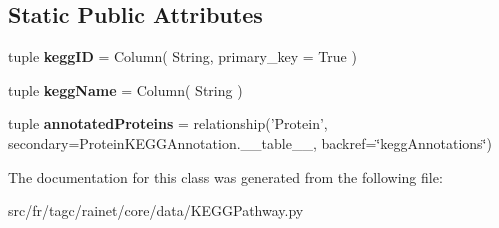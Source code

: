 \subsection*{Static Public Attributes}
\begin{DoxyCompactItemize}
\item 
\hypertarget{classsrc_1_1fr_1_1tagc_1_1rainet_1_1core_1_1data_1_1KEGGPathway_1_1KEGGPathway_a87bfa8948cee850036a02dc04a97f3e3}{tuple {\bfseries kegg\-I\-D} = Column( String, primary\-\_\-key = True )}\label{classsrc_1_1fr_1_1tagc_1_1rainet_1_1core_1_1data_1_1KEGGPathway_1_1KEGGPathway_a87bfa8948cee850036a02dc04a97f3e3}

\item 
\hypertarget{classsrc_1_1fr_1_1tagc_1_1rainet_1_1core_1_1data_1_1KEGGPathway_1_1KEGGPathway_a376c34777443e3b323cbffacbf0b3c97}{tuple {\bfseries kegg\-Name} = Column( String )}\label{classsrc_1_1fr_1_1tagc_1_1rainet_1_1core_1_1data_1_1KEGGPathway_1_1KEGGPathway_a376c34777443e3b323cbffacbf0b3c97}

\item 
\hypertarget{classsrc_1_1fr_1_1tagc_1_1rainet_1_1core_1_1data_1_1KEGGPathway_1_1KEGGPathway_aa7e0d488e23045e0c308414e819c0648}{tuple {\bfseries annotated\-Proteins} = relationship('Protein', secondary=Protein\-K\-E\-G\-G\-Annotation.\-\_\-\-\_\-table\-\_\-\-\_\-, backref=\char`\"{}kegg\-Annotations\char`\"{})}\label{classsrc_1_1fr_1_1tagc_1_1rainet_1_1core_1_1data_1_1KEGGPathway_1_1KEGGPathway_aa7e0d488e23045e0c308414e819c0648}

\end{DoxyCompactItemize}


The documentation for this class was generated from the following file\-:\begin{DoxyCompactItemize}
\item 
src/fr/tagc/rainet/core/data/K\-E\-G\-G\-Pathway.\-py\end{DoxyCompactItemize}
